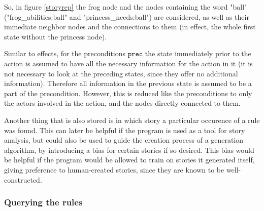 So, in figure \ref{storyrep} the frog node and the nodes containing the word
"ball" ("frog\_abilities:ball" and "princess\_needs:ball") are considered, as
well as their immediate neighbor nodes and the connections to them (in effect,
the whole first state without the princess node).

Similar to effects, for the preconditions $\texttt{prec}$ the state immediately prior to the action
is assumed to have all the
necessary information for the action in it (it is not necessary to look at the 
preceding states, since they offer no additional information). Therefore all
information in the previous state is assumed to be a part of the precondition.
However, this is reduced like the preconditions to only the actors involved in
the action, and the nodes directly connected to them.

Another thing that is also stored is in which story a particular occurence of a
rule was found. This can later be helpful if the program is used as a tool for
story analysis, but could also be used to guide the creation process of a
generation algorithm, by introducing a bias for certain stories if so desired.
This bias would be helpful if the program would be allowed to train on stories
it generated itself, giving preference to human-created stories, since they are
known to be well-constructed.

\subsubsection{Querying the rules}

